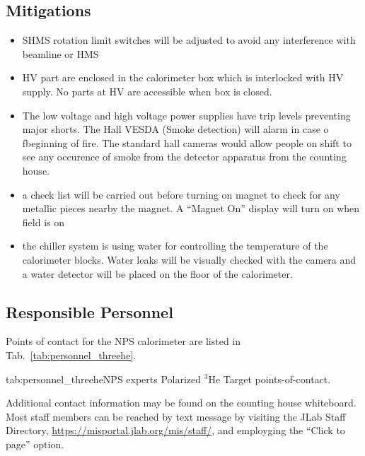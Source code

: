 \subsection{Mitigations}
\begin{itemize}
\item SHMS rotation limit switches will be adjusted to avoid any interference with beamline or HMS
\item HV part are enclosed in the calorimeter box which is interlocked with HV supply. No parts at HV are accessible when box is closed.
\item  The low voltage and high voltage power supplies have trip levels preventing major shorts.  The Hall VESDA (Smoke detection) will alarm in case o fbeginning of fire.  The standard hall cameras would allow people on shift to see any occurence of smoke from the detector apparatus from the counting house.
\item a check list will be carried out before turning on magnet to check for any metallic pieces nearby the magnet. A ``Magnet On'' display will turn on when field is on
\item the chiller system is using water for controlling the temperature of the calorimeter blocks. Water leaks will be visually checked with the camera and a water detector will be placed on the floor of the calorimeter.
\end{itemize}

\subsection{Responsible Personnel}

Points of contact for the NPS calorimeter are listed in Tab.~\ref{tab:personnel_threehe}.

\begin{namestab}{tab:personnel_threehe}{NPS experts}
   {Polarized ${}^3$He Target points-of-contact.}
  \CarlosMunoz{}
\end{namestab}

Additional contact information may be found on the counting house
whiteboard.  Most staff members can be reached by text message by
visiting the JLab Staff Directory,
\url{https://misportal.jlab.org/mis/staff/}, and employging
the ``Click to page'' option.

